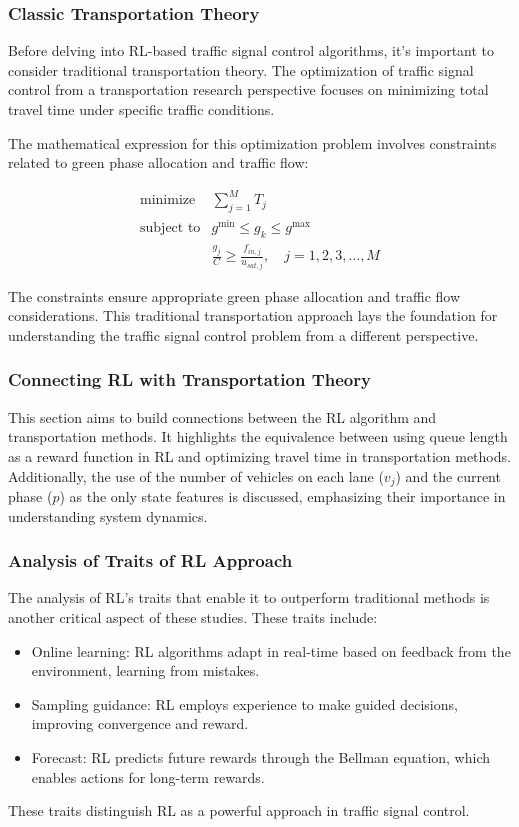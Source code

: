 \subsubsection{Classic Transportation Theory}

Before delving into RL-based traffic signal control algorithms, it's important to consider traditional transportation theory. The optimization of traffic signal control from a transportation research perspective focuses on minimizing total travel time under specific traffic conditions.

The mathematical expression for this optimization problem involves constraints related to green phase allocation and traffic flow:

\[
\begin{array}{ll}
\text{minimize} & \sum_{j=1}^M T_j \\
\text{subject to} & g^{\text{min}} \leq g_k \leq g^{\max} \\
& \frac{g_j}{C} \geq \frac{f_{in, j}}{u_{sat, j}}, \quad j=1,2,3, \ldots, M
\end{array}
\]

The constraints ensure appropriate green phase allocation and traffic flow considerations. This traditional transportation approach lays the foundation for understanding the traffic signal control problem from a different perspective.

\subsubsection{Connecting RL with Transportation Theory}

This section aims to build connections between the RL algorithm and transportation methods. It highlights the equivalence between using queue length as a reward function in RL and optimizing travel time in transportation methods. Additionally, the use of the number of vehicles on each lane ($v_j$) and the current phase ($p$) as the only state features is discussed, emphasizing their importance in understanding system dynamics.

\subsubsection{Analysis of Traits of RL Approach}

The analysis of RL's traits that enable it to outperform traditional methods is another critical aspect of these studies. These traits include:

\begin{itemize}
    \item Online learning: RL algorithms adapt in real-time based on feedback from the environment, learning from mistakes.
    \item Sampling guidance: RL employs experience to make guided decisions, improving convergence and reward.
    \item Forecast: RL predicts future rewards through the Bellman equation, which enables actions for long-term rewards.
\end{itemize}

These traits distinguish RL as a powerful approach in traffic signal control.

